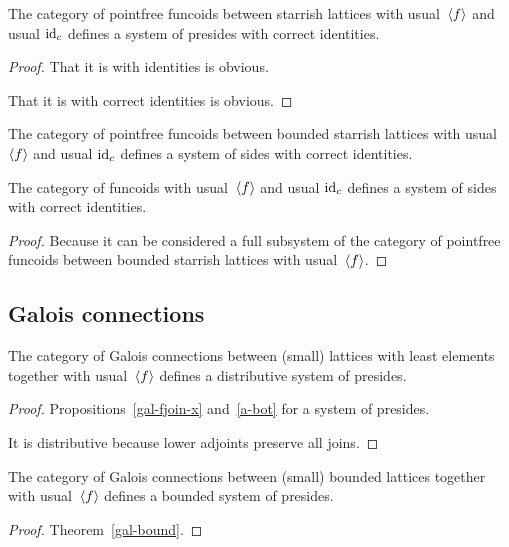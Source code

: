 \begin{prop}
The category of pointfree funcoids between starrish lattices with usual~$\left\langle f\right\rangle$ and usual $\operatorname{id}_c$ defines a system of presides with correct identities.
\end{prop}

\begin{proof}
That it is with identities is obvious.

That it is with correct identities is obvious.
\end{proof}

\begin{obvious}
The category of pointfree funcoids between bounded starrish lattices with usual~$\left\langle f\right\rangle$ and usual $\operatorname{id}_c$ defines a system of sides with correct identities.
\end{obvious}

\begin{prop}
The category of funcoids with usual~$\left\langle f\right\rangle$ and usual $\operatorname{id}_c$ defines a system of sides with correct identities.
\end{prop}

\begin{proof}
Because it can be considered a full subsystem of
the category of pointfree funcoids between bounded starrish lattices with usual~$\left\langle f\right\rangle$.
\end{proof}

\subsection{Galois connections}

\begin{prop}
The category of Galois connections between (small) lattices with least elements together with usual~$\left\langle f\right\rangle$
defines a distributive system of presides.
\end{prop}

\begin{proof}
Propositions~\ref{gal-fjoin-x} and~\ref{a-bot} for a system of presides.

It is distributive because lower adjoints preserve all joins.
\end{proof}

\begin{prop}
The category of Galois connections between (small) bounded lattices together with usual~$\left\langle f\right\rangle$
defines a bounded system of presides.
\end{prop}

\begin{proof}
Theorem~\ref{gal-bound}.
\end{proof}

